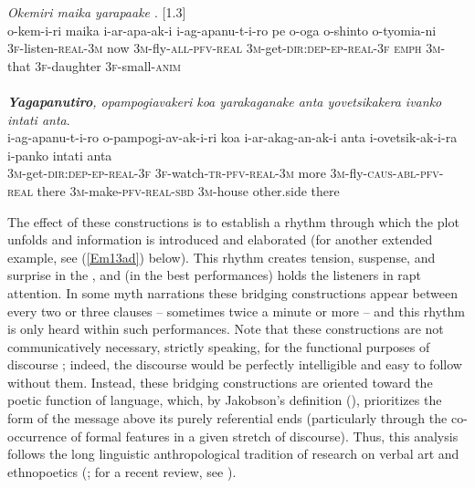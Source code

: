 \documentclass[output=paper]{LSP/langsci}
\begin{document}
\begin{exe}
\ex \label{Em03ab}
\begin{xlist}
\ex \label{Emex:03a}
\glt \textit{Okemiri maika yarapaake \underline{}}. [1.3]\\
\gll o-kem-i-ri maika i-ar-apa-ak-i i-ag-apanu-t-i-ro pe o-oga o-shinto o-tyomia-ni\\
 \textsc{3f-}listen\textsc{-real-3m} now \textsc{3m-}fly\textsc{-all-pfv-real} \textsc{3m-}get\textsc{-dir:dep-ep-real-3f} \textsc{emph} \textsc{3m-}that \textsc{3f-}daughter \textsc{3f-}small\textsc{-anim}\\
\glt {}\\
\ex \label{Emex:03b}
\glt \textit{\textbf{Yagapanutiro}, opampogiavakeri koa yarakaganake anta yovetsikakera ivanko intati anta}.\\
\gll i-ag-apanu-t-i-ro o-pampogi-av-ak-i-ri koa i-ar-akag-an-ak-i anta i-ovetsik-ak-i-ra i-panko intati anta \\     	      
   \textsc{3m-}get\textsc{-dir:dep-ep-real-3f} \textsc{3f-}watch\textsc{-tr-pfv-real-3m} more \textsc{3m-}fly\textsc{-caus-abl-pfv-real} there \textsc{3m-}make\textsc{-pfv-real-sbd} \textsc{3m-}house other.side there\\
\glt {}
\end{xlist}
\end{exe}
 
The effect of these constructions is to establish a  rhythm through which the plot unfolds and information is introduced and elaborated (for another extended example, see (\ref{Em13ad}) below). This rhythm creates tension, suspense, and surprise in the , and (in the best performances) holds the listeners in rapt attention. In some myth narrations these bridging constructions appear between every two or three clauses – sometimes twice a minute or more – and this  rhythm is only heard within such performances. Note that these constructions are not communicatively necessary, strictly speaking, for the functional purposes of discourse ; indeed, the discourse would be perfectly intelligible and easy to follow without them. Instead, these bridging constructions are oriented toward the poetic function of language, which, by Jakobson’s definition (\citeyear{jakobson60}), prioritizes the form of the message above its purely referential ends (particularly through the co-occurrence of formal features in a given stretch of discourse). Thus, this analysis follows the long linguistic anthropological tradition of research on verbal art and ethnopoetics (\citealt{bauman77,hymes81}; for a recent review, see \citealt{webster13}).
%
\end{document}
